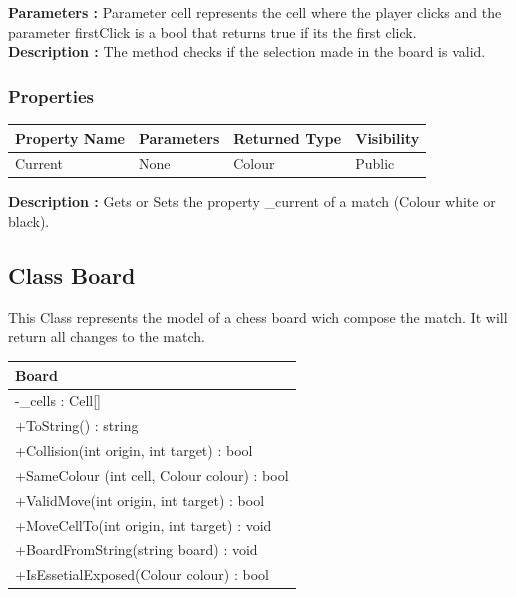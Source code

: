 \documentclass[12pt]{article}
\begin{document}
\textbf{Parameters :} Parameter cell represents the cell
where the player clicks and the parameter firstClick is a bool
that returns true if its the first click.
\\

\textbf{Description :} The method checks if the selection made
in the board is valid.

\subsubsection{Properties}

\begin{table}[H]
    \begin{tabular}{|l|l|l|l|}
    \hline
    \rowcolor[HTML]{EFEFEF} 
    \cellcolor[HTML]{EFEFEF}\textbf{Property Name} & \textbf{Parameters}  & \textbf{Returned Type} & \textbf{Visibility} \\ \hline
    Current                                        & None                 & Colour                 & Public              \\ \hline
    \end{tabular}
\end{table}

\textbf{Description :} Gets or Sets the property \_current of a match (Colour white or black).

\newpage


\subsection{Class Board}

This Class represents the model of a chess board wich compose the
match. It will return all changes to the match.

\begin{table}[H]
    \begin{tabular}{|l|}
    \hline
    \rowcolor[HTML]{C0C0C0} 
    \textbf{Board}                              \\ \hline
    \rowcolor[HTML]{EFEFEF}                     
    -\_cells : Cell[]                           \\ \hline
    +ToString() : string                        \\ \hline
    +Collision(int origin, int target) : bool   \\ \hline
    +SameColour (int cell, Colour colour) : bool\\ \hline
    +ValidMove(int origin, int target) : bool   \\ \hline
    +MoveCellTo(int origin, int target) : void  \\ \hline
    +BoardFromString(string board) : void       \\ \hline
    +IsEssetialExposed(Colour colour) : bool
    \end{tabular}
\end{table}
\end{document}

